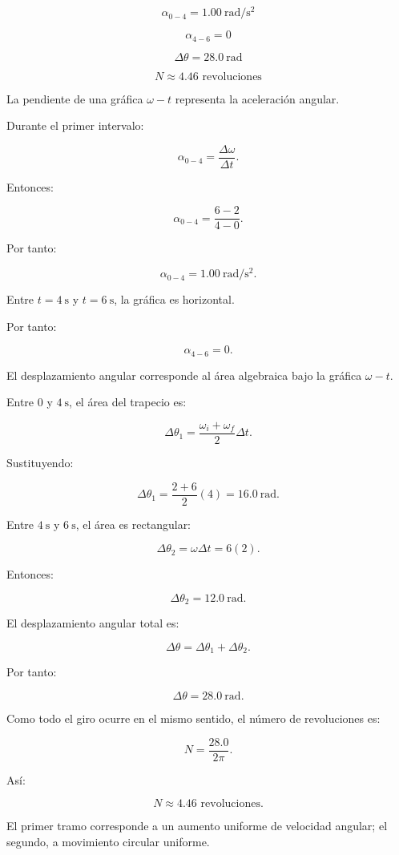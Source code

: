 \begin{respuesta}
\[
\boxed{\alpha_{0-4}=\SI{1.00}{\radian\per\second\squared}}
\]

\[
\boxed{\alpha_{4-6}=0}
\]

\[
\boxed{\Delta\theta=\SI{28.0}{\radian}}
\]

\[
\boxed{N\approx4.46\text{ revoluciones}}
\]
\end{respuesta}

\begin{explicacion}
La pendiente de una gráfica \(\omega-t\) representa la
aceleración angular.

Durante el primer intervalo:

\[
\alpha_{0-4}=\frac{\Delta\omega}{\Delta t}.
\]

Entonces:

\[
\alpha_{0-4}=\frac{6-2}{4-0}.
\]

Por tanto:

\[
\boxed{\alpha_{0-4}=\SI{1.00}{\radian\per\second\squared}}.
\]

Entre \(t=\SI{4}{\second}\) y \(t=\SI{6}{\second}\),
la gráfica es horizontal.

Por tanto:

\[
\boxed{\alpha_{4-6}=0}.
\]

El desplazamiento angular corresponde al área algebraica
bajo la gráfica \(\omega-t\).

Entre \(0\) y \(\SI{4}{\second}\), el área del trapecio es:

\[
\Delta\theta_1
=\frac{\omega_i+\omega_f}{2}\Delta t.
\]

Sustituyendo:

\[
\Delta\theta_1=\frac{2+6}{2}(4)
=\SI{16.0}{\radian}.
\]

Entre \(\SI{4}{\second}\) y \(\SI{6}{\second}\),
el área es rectangular:

\[
\Delta\theta_2=\omega\Delta t=6(2).
\]

Entonces:

\[
\Delta\theta_2=\SI{12.0}{\radian}.
\]

El desplazamiento angular total es:

\[
\Delta\theta=\Delta\theta_1+\Delta\theta_2.
\]

Por tanto:

\[
\boxed{\Delta\theta=\SI{28.0}{\radian}}.
\]

Como todo el giro ocurre en el mismo sentido, el número
de revoluciones es:

\[
N=\frac{28.0}{2\pi}.
\]

Así:

\[
\boxed{N\approx4.46\text{ revoluciones}}.
\]

El primer tramo corresponde a un aumento uniforme de
velocidad angular; el segundo, a movimiento circular uniforme.
\end{explicacion}


